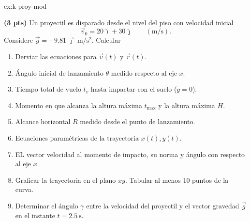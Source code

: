 \begin{multicols}{2}
    \begin{excercise}[][][]{ex:k-proy-mod}{
    \textbf{(3 pts)}  
    Un proyectil es disparado desde el nivel del piso con velocidad inicial
    \[
        \vec v_0 = 20\,\hat\imath + 30\,\hat\jmath \qquad (\mathrm{m/s}).
    \]
    Considere \(\vec g = -9.81\,\vec{\jmath}\ \mathrm{m/s^2}\).
    Calcular
    \begin{enumerate}
        \item Derviar las ecuaciones para $\vec{v}(t)$ y $\vec{r}(t)$. 
        \item Ángulo inicial de lanzamiento \(\theta\) medido respecto al eje \(x\).
        \item Tiempo total de vuelo \(t_v\) hasta impactar con el suelo (\(y=0\)).
        \item Momento en que alcanza la altura máxima \(t_{\max}\) y la altura máxima \(H\).
        \item Alcance horizontal \(R\) medido desde el punto de lanzamiento.
        \item Ecuaciones paramétricas de la trayectoria \(x(t),y(t)\).
        \item EL  vector velocidad al momento de impacto, su  norma y ángulo con respecto al eje \(x\).
        \item Graficar la trayectoria en el plano \(xy\). Tabular al menos 10 puntos de la curva.  
        \item Determinar el ángulo \(\gamma\) entre la velocidad del proyectil y el vector gravedad \(\vec g\) en el instante \(t=2.5\ \mathrm{s}\).
    \end{enumerate}
}
\end{excercise}
 

\end{multicols}
